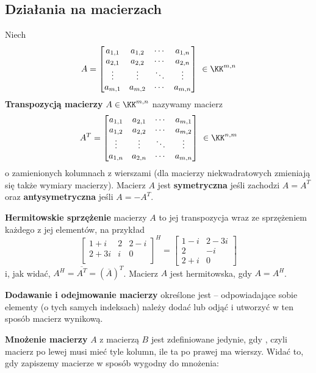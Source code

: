\subsection{Działania na macierzach}
Niech 
$$
A=\begin{bmatrix}
    a_{1,1} & a_{1,2} & \cdots & a_{1,n} \\
    a_{2,1} & a_{2,2} & \cdots & a_{2,n} \\
    \vdots & \vdots & \ddots & \vdots \\
    a_{m,1} & a_{m,2} & \cdots & a_{m,n}    
\end{bmatrix} \ \in \KK^{m,n}
$$
\textbf{Transpozycją macierzy} $A\in\KK^{m,n}$ nazywamy macierz
$$
A^T=\begin{bmatrix}
    a_{1,1} & a_{2,1} & \cdots & a_{m,1} \\
    a_{1,2} & a_{2,2} & \cdots & a_{m,2} \\
    \vdots & \vdots & \ddots & \vdots \\
    a_{1,n} & a_{2,n} & \cdots & a_{m,n}    
\end{bmatrix} \ \in \KK^{n,m}
$$
o zamienionych kolumnach z wierszami (dla macierzy niekwadratowych zmieniają się także wymiary macierzy). Macierz $A$ jest \textbf{symetryczna} jeśli zachodzi $A=A^T$ oraz \textbf{antysymetryczna} jeśli $A=-A^T$.

\textbf{Hermitowskie sprzężenie} macierzy $A$ to jej transpozycja wraz ze sprzężeniem każdego z jej elementów, na przykład
$$
\begin{bmatrix}
    1+i & 2 & 2 - i \\
    2 + 3i  & i & 0 \\
\end{bmatrix}^H = 
\begin{bmatrix}
    1 - i & 2 - 3i \\
    2 & -i \\
    2 + i & 0
\end{bmatrix}
$$
i, jak widać, $A^H=\overline{A^T}=(\overline{A})^T$. Macierz $A$ jest hermitowska, gdy $A=A^H$.

\textbf{Dodawanie i odejmowanie macierzy} określone jest  -- odpowiadające sobie elementy (o tych samych indeksach) należy dodać lub odjąć i utworzyć w ten sposób macierz wynikową.

\textbf{Mnożenie macierzy} $A$ z macierzą $B$ jest zdefiniowane jedynie, gdy , czyli macierz po lewej musi mieć tyle kolumn, ile ta po prawej ma wierszy. Widać to, gdy zapiszemy macierze w sposób wygodny do mnożenia:

